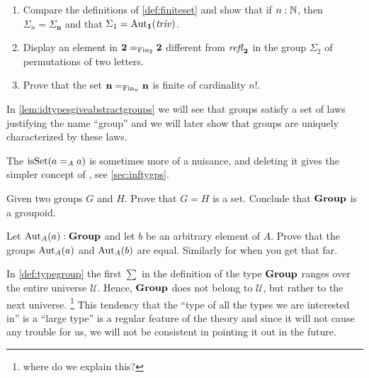 \begin{xca}
  \begin{enumerate}
  \item Compare the definitions of \cref{def:finiteset} and show that if $n:\mathbb{N}$, then $\Sigma_n=\Sigma_{\mathbf n}$ %
and that $\Sigma_{1}=\mathrm{Aut}_{\mathbf 1}(\mathop{\mathit{triv}})$.
\item Display an element in $\mathbf 2=_{\mathrm{Fin}_2}\mathbf 2$ different from $\mathop{{\it refl}_{\mathbf 2}}$ in the group $\Sigma_{2}$ of permutations of two letters.  
\item Prove that the set $\mathbf n=_{\mathrm{Fin}_n}\mathbf n$ is finite of cardinality $n!$.
  \end{enumerate} 
\end{xca}

\begin{remark}
In \cref{lem:idtypesgiveabstractgroups} we will see that groups satisfy a set of laws justifying the name ``group''
and we will later show that groups are uniquely characterized by these laws.
\end{remark}
\begin{remark}
  The $\mathrm{isSet}(a=_Aa)$ is sometimes more of a nuisance, and deleting it gives the simpler concept of \aninftygp, see \cref{sec:inftygps}.
\end{remark}
\begin{xca}
  Given two groups $G$ and $H$.  Prove that $G=H$ is a set.  Conclude that $\mathbf{Group}$ is a groupoid.  
\end{xca}
\begin{xca}
   Let $\mathrm{Aut}_A(a):\mathbf{Group}$ and let $b$ be an arbitrary element of $A$.  Prove that the groups $\mathrm{Aut}_A(a)$ and $\mathrm{Aut}_A(b)$ are equal.  Similarly for \inftygps when you get that far.
\end{xca}
\begin{remark}\label{rem:monoidandabsgplarge}
 In \cref{def:typegroup} the first $\sum$ in the definition of the type $\mathbf{Group}$ ranges over the entire universe $\mathcal U$.  Hence, $\mathbf{Group}$ does not belong to $\mathcal U$, but rather to the next universe. \footnote{where do we explain this?}  This tendency that the ``type of all the types we are interested in'' is a ``large type'' is a regular feature of the theory and since it will not cause any trouble for us, we will not be consistent in pointing it out in the future.
  \end{remark}

